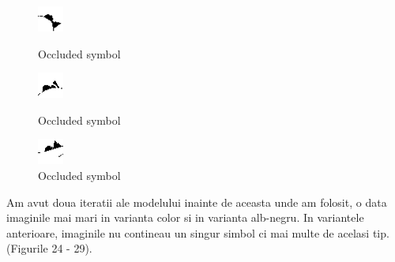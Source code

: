 \documentclass{article}
\begin{document}
\begin{figure}[!htb]
  \begin{minipage}{0.3\textwidth}
    \centering
    \includegraphics[width=.35\linewidth]{occluded1.png}
    \caption{Occluded symbol}\label{Fig:Occluded1}
  \end{minipage}\hfill
  \begin{minipage}{0.3\textwidth}
    \centering
    \includegraphics[width=.35\linewidth]{occluded2.png}
    \caption{Occluded symbol}\label{Fig:Occluded2}
  \end{minipage}
  \begin{minipage}{0.3\textwidth}
    \centering
    \includegraphics[width=.35\linewidth]{occluded3.png}
    \caption{Occluded symbol}\label{Fig:Occluded3}
  \end{minipage}
\end{figure}

Am avut doua iteratii ale modelului inainte de aceasta unde am folosit, o data imaginile mai mari in varianta color si in varianta alb-negru.
In variantele anterioare, imaginile nu contineau un singur simbol ci mai multe de acelasi tip. (Figurile 24 - 29).
\end{document}
